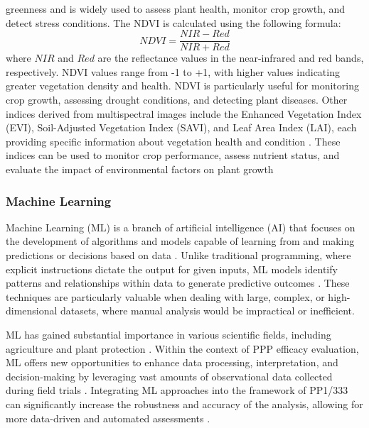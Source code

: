 \documentclass[12pt,a4paper,oneside]{report}
\begin{document}
greenness and is widely used to assess plant health, monitor crop growth, and
detect stress conditions. The NDVI is calculated using the following formula:
\[
NDVI = \frac{NIR - Red}{NIR + Red}
\]
where \(NIR\) and \(Red\) are the reflectance values in the near-infrared and red
bands, respectively. NDVI values range from -1 to +1, with higher values indicating
greater vegetation density and health. NDVI is particularly useful for monitoring
crop growth, assessing drought conditions, and detecting plant diseases.
Other indices derived from multispectral images include the Enhanced
Vegetation Index (EVI), Soil-Adjusted Vegetation Index (SAVI), and Leaf Area
Index (LAI), each providing specific information about vegetation health and
condition
\cite{hueteOverviewRadiometricBiophysical2002,qiModifiedSoilAdjusted1994}. 
These indices can be used to monitor crop performance, assess
nutrient status, and evaluate the impact of environmental factors on plant
growth
\cite{jonesRemoteSensingVegetation2010,mahleinHyperspectralSensorsImaging2018}

\subsubsection{Machine Learning}

Machine Learning (ML) is a branch of artificial intelligence (AI) that 
focuses on the development of algorithms and models capable of learning 
from and making predictions or decisions based on data \cite{kozaAutomatedDesignBoth1996}. 
Unlike traditional 
programming, where explicit instructions dictate the output for given inputs, 
ML models identify patterns and relationships within data to generate 
predictive outcomes \cite{hastieElementsStatisticalLearning2009}. 
These techniques are particularly valuable when 
dealing with large, complex, or high-dimensional datasets, where manual 
analysis would be impractical or inefficient.

ML has gained substantial importance in various scientific fields, including 
agriculture \cite{araujoMachineLearningApplications2023} and 
plant protection \cite{bockVisualEstimatesFully2020}. 
Within the context of PPP 
efficacy evaluation, ML offers new opportunities to enhance data processing, 
interpretation, and decision-making by leveraging vast amounts of observational 
data collected during field trials \cite{bockSpecialIssuePhytopathometry2022}. Integrating ML approaches into the framework 
of PP1/333 can significantly increase the robustness and accuracy of the analysis, 
allowing for more data-driven and automated assessments 
\cite{barbedoAutomaticMethodDetect2014,arnalbarbedoDigitalImageProcessing2013,bockPlantDiseaseSeverity2010}.
\end{document}
